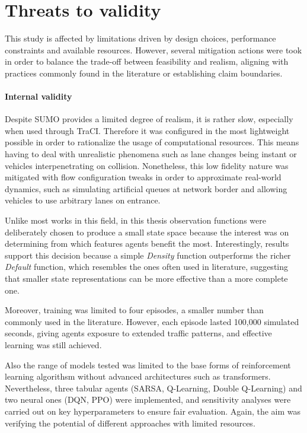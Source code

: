 \section{Threats to validity}

This study is affected by limitations driven by design choices, performance constraints and available resources.
However, several mitigation actions were took in order to balance the trade-off between feasibility and realism, aligning with practices commonly found in the literature or establishing claim boundaries.

\paragraph{Internal validity}

Despite SUMO provides a limited degree of realism, it is rather slow, especially when used through TraCI.
Therefore it was configured in the most lightweight possible in order to rationalize the usage of computational resources.
This means having to deal with unrealistic phenomena such as lane changes being instant or vehicles interpenetrating on collision.
Nonetheless, this low fidelity nature was mitigated with flow configuration tweaks in order to approximate real-world dynamics, such as simulating artificial queues at network border and allowing vehicles to use arbitrary lanes on entrance.

Unlike most works in this field, in this thesis observation functions were deliberately chosen to produce a small state space because the interest was on determining from which features agents benefit the most.
Interestingly, results support this decision because a simple \textit{Density} function outperforms the richer \textit{Default} function, which resembles the ones often used in literature, suggesting that smaller state representations can be more effective than a more complete one.

Moreover, training was limited to four episodes, a smaller number than commonly used in the literature.
However, each episode lasted 100,000 simulated seconds, giving agents exposure to extended traffic patterns, and effective learning was still achieved.

Also the range of models tested was limited to the base forms of reinforcement learning algorithsm without advanced architectures such as transformers.
Nevertheless, three tabular agents (SARSA, Q-Learning, Double Q-Learning) and two neural ones (DQN, PPO) were implemented, and sensitivity analyses were carried out on key hyperparameters to ensure fair evaluation.
Again, the aim was verifying the potential of different approaches with limited resources.

